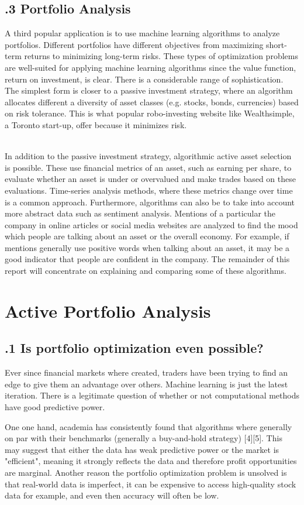\documentclass[12pt]{report}
\begin{document}
\subsection*{.3 Portfolio Analysis}
\par\indent
A third popular application is to use machine learning algorithms to analyze portfolios. Different portfolios have different objectives from maximizing short-term returns to minimizing long-term risks. These types of optimization problems are well-suited for applying machine learning algorithms since the value function, return on investment, is clear. There is a considerable range of sophistication. The simplest form is closer to a passive investment strategy, where an algorithm allocates different a diversity of asset classes (e.g. stocks, bonds, currencies) based on risk tolerance. This is what popular robo-investing website like Wealthsimple, a Toronto start-up, offer because it minimizes risk.
\par\noindent \\
In addition to the passive investment strategy, algorithmic active asset selection is possible. These use financial metrics of an asset, such as earning per share, to evaluate whether an asset is under or overvalued and make trades based on these evaluations. Time-series analysis methods, where these metrics change over time is a common approach. Furthermore, algorithms can also be to take into account more abstract data such as sentiment analysis. Mentions of a particular the company in online articles or social media websites are analyzed to find the mood which people are talking about an asset or the overall economy. For example, if mentions generally use positive words when talking about an asset, it may be a good indicator that people are confident in the company. The remainder of this report will concentrate on explaining and comparing some of these algorithms.

\section*{ Active Portfolio Analysis}
\subsection*{.1 Is portfolio optimization even possible? }

Ever since financial markets where created, traders have been trying to find an edge to give them an advantage over others. Machine learning is just the latest iteration. There is a legitimate question of whether or not computational methods have good predictive power.
\par\noindent
One one hand, academia has consistently found that algorithms where generally on par with their benchmarks (generally a buy-and-hold strategy) [4][5]. This may suggest that either the data has weak predictive power or the market is "efficient", meaning it strongly reflects the data and therefore profit opportunities are marginal. Another reason the portfolio optimization problem is unsolved is that real-world data is imperfect, it can be expensive to access high-quality stock data for example, and even then accuracy will often be low.
\end{document}
